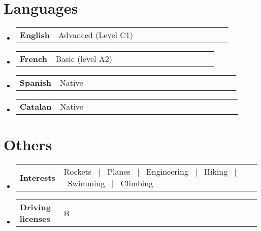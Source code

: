 \documentclass[a4paper,11pt,dvipsnames]{article}
\newcommand{\resumeSectionTypeOne}[2]{
	\item\begin{tabular*}{0.99\textwidth}[t]{
			p{0.18\linewidth}p{0.81\linewidth}
		}
		\textbf{#1} & #2
	\end{tabular*}\vspace{-2pt}
}
\newcommand{\resumeHeadingListStart}{
	\begin{itemize}[leftmargin=0.15in, label={}]
	}
\newcommand{\resumeHeadingListEnd}{\end{itemize}}
\begin{document}
	\section{Languages}
	\resumeHeadingListStart{}
	\resumeSectionTypeOne{English}{Advanced (Level C1)}
	\resumeSectionTypeOne{French}{Basic (level A2)}
	\resumeSectionTypeOne{Spanish}{Native}
	\resumeSectionTypeOne{Catalan}{Native}
	\resumeHeadingListEnd{}
	
	\section{Others}
	\resumeHeadingListStart{}
	\resumeSectionTypeOne{Interests}{Rockets \ $|$ \ Planes \ $|$ \ Engineering \ $|$ \ Hiking \ $|$ \ Swimming \ $|$ \ Climbing}
	\resumeHeadingListEnd{}
	
	\resumeHeadingListStart{}
	\resumeSectionTypeOne{Driving licenses}{B}
	\resumeHeadingListEnd{}
	
\end{document}
